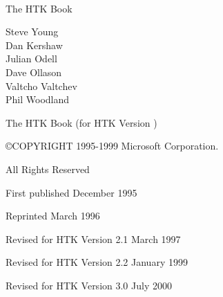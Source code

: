 \documentclass[a4paper,oneside]{book}
\begin{document}
\newlength{\saveindent}
\setlength{\saveindent}{\parindent}



{ \Large \ \\

\vspace{1cm}

\noindent The HTK Book

\vspace{1cm}

\noindent Steve Young \\
\noindent Dan Kershaw \\
\noindent Julian Odell \\
\noindent Dave Ollason \\
\noindent Valtcho Valtchev \\
\noindent Phil Woodland \\

\vspace{1cm}

\noindent The HTK Book (for HTK Version \version)

\vspace{1.5cm}

\noindent \copyright COPYRIGHT 1995-1999 Microsoft Corporation. 

\vspace{0.2cm}

\noindent All Rights Reserved

\vspace{1.5cm}

\noindent First published December 1995
\vspace{0.2cm}

\noindent Reprinted March 1996 
\vspace{0.2cm}

\noindent Revised for HTK Version 2.1 March 1997 
\vspace{0.2cm}

\noindent Revised for HTK Version 2.2 January 1999 
\vspace{0.2cm}

\noindent Revised for HTK Version 3.0 July 2000 
\vspace{0.2cm}

}

\newpage
\tableofcontents

\newpage
\pagestyle{myheadings}
\end{document}
